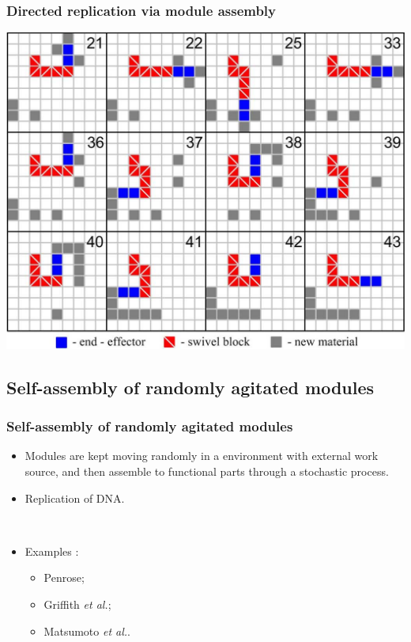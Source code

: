 \documentclass[14pt]{beamer}
\theoremstyle{remark}
\newcommand{\etal}{\textit{et al.}}
\begin{document}
\begin{frame}
  \frametitle{Directed replication via module assembly}
	\begin{center}
	  \includegraphics[width=.7\textwidth]{zykov-279-b}
	\end{center}
\end{frame}

\subsection{Self-assembly of randomly agitated modules}
\begin{frame}
  \frametitle{Self-assembly of randomly agitated modules}
  \begin{itemize}
  	\item Modules are kept moving randomly in a environment with external work source, and then assemble to functional parts through a stochastic process.
  	\item Replication of DNA.
  	
  	\mbox{ }
  	
  	\item Examples :
  	\begin{itemize}
  	  \item Penrose\cite{penrose_self-reproducing_1957};
  	  \item Griffith \etal \cite{griffith_growing_2004}\cite{griffith_self-replication_2005};
  	  \item Matsumoto \etal \cite{matsumoto_passive_2009}.
  	\end{itemize}
	\end{itemize}
\end{frame}
\end{document}
